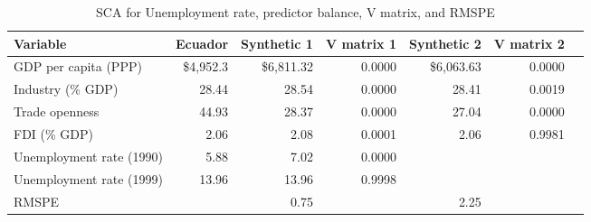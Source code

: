 \begin{table}[!h]
\begin{center}
\caption{SCA for Unemployment rate, predictor balance, V matrix, and RMSPE} \label{table:UNEMP_balance}
\begin{tabular}{l r r r r r r}     \\ \toprule
  Variable                 &    Ecuador &  Synthetic 1 & V matrix 1 & Synthetic 2 & V matrix 2 \\ \midrule 
  GDP per capita (PPP)     &  \$4,952.3 &   \$6,811.32 &     0.0000 &  \$6,063.63 &     0.0000 \\
  Industry (\% GDP)        &      28.44 &        28.54 &     0.0000 &       28.41 &     0.0019 \\
  Trade openness           &      44.93 &        28.37 &     0.0000 &       27.04 &     0.0000 \\
  FDI (\% GDP)             &       2.06 &         2.08 &     0.0001 &        2.06 &     0.9981 \\ \midrule
  Unemployment rate (1990) &       5.88 &         7.02 &     0.0000 &             &            \\
  Unemployment rate (1999) &      13.96 &        13.96 &     0.9998 &             &            \\ \midrule
  RMSPE                    &            &         0.75 &            &        2.25 &            \\
  \bottomrule 
\end{tabular}
\end{center}
\end{table}